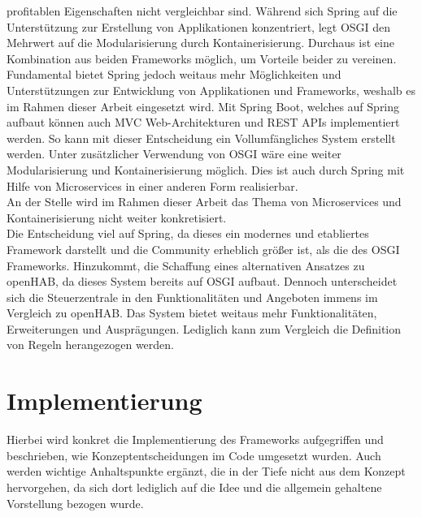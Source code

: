         profitablen Eigenschaften nicht vergleichbar sind. Während sich Spring auf die Unterstützung zur Erstellung von Applikationen konzentriert, 
        legt \acs{OSGI} den Mehrwert auf die Modularisierung durch Kontainerisierung. Durchaus ist eine Kombination aus beiden 
        Frameworks möglich, um Vorteile beider zu vereinen. Fundamental bietet Spring jedoch weitaus mehr Möglichkeiten und Unterstützungen 
        zur Entwicklung von Applikationen und Frameworks, weshalb es im Rahmen dieser Arbeit eingesetzt wird. Mit Spring Boot, welches auf Spring 
        aufbaut können auch \acl{MVC} Web-Architekturen und \acs{REST} \acs{API}s implementiert werden. So kann mit dieser Entscheidung 
        ein Vollumfängliches System erstellt werden. Unter zusätzlicher Verwendung von \acs{OSGI} wäre eine weiter Modularisierung und Kontainerisierung möglich. Dies 
        ist auch durch Spring mit Hilfe von Microservices in einer anderen Form realisierbar. 
        \\
        An der Stelle wird im Rahmen dieser Arbeit das Thema von Microservices und Kontainerisierung nicht weiter konkretisiert.
        \\
        \linebreak
        Die Entscheidung viel auf Spring, da dieses ein modernes und etabliertes Framework darstellt und die 
        Community erheblich größer ist, als die des \acs{OSGI} Frameworks. Hinzukommt, die Schaffung eines alternativen Ansatzes zu openHAB, da dieses System bereits 
        auf \acs{OSGI} aufbaut. 
        Dennoch unterscheidet sich die Steuerzentrale in den Funktionalitäten und Angeboten immens im Vergleich zu openHAB. Das System bietet weitaus mehr 
        Funktionalitäten, Erweiterungen und Ausprägungen. Lediglich kann zum Vergleich die Definition von Regeln herangezogen werden. 

\section{Implementierung}
\label{sec:implementation}
    Hierbei wird konkret die Implementierung des Frameworks aufgegriffen und beschrieben, wie Konzeptentscheidungen im Code umgesetzt wurden. 
    Auch werden wichtige Anhaltspunkte ergänzt, die in der Tiefe nicht aus dem Konzept hervorgehen, da sich dort lediglich auf die Idee und die allgemein gehaltene 
    Vorstellung bezogen wurde. 

